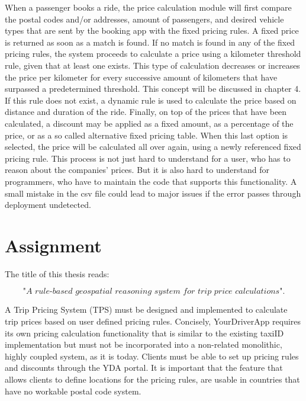 When a passenger books a ride, the price calculation module will first compare the postal codes and/or addresses, amount of passengers, and desired vehicle types that are sent by the booking app with the fixed pricing rules. A fixed price is returned as soon as a match is found. If no match is found in any of the fixed pricing rules, the system proceeds to calculate a price using a kilometer threshold rule, given that at least one exists. This type of calculation decreases or increases the price per kilometer for every successive amount of kilometers that have surpassed a predetermined threshold. This concept will be discussed in chapter 4. If this rule does not exist, a dynamic rule is used to calculate the price based on distance and duration of the ride. Finally, on top of the prices that have been calculated, a discount may be applied as a fixed amount, as a percentage of the price, or as a so called alternative fixed pricing table. When this last option is selected, the price will be calculated all over again, using a newly referenced fixed pricing rule. This process is not just hard to understand for a user, who has to reason about the companies' prices. But it is also hard to understand for programmers, who have to maintain the code that supports this functionality. A small mistake in the csv file could lead to major issues if the error passes through deployment undetected.

%
\section{Assignment}
The title of this thesis reads:

\[\textit{"A rule-based geospatial reasoning system for trip price calculations"}.\] \hfill

A Trip Pricing System (TPS) must be designed and implemented to calculate trip prices based on user defined pricing rules. Concisely, YourDriverApp requires its own pricing calculation functionality that is similar to the existing taxiID implementation but must not be incorporated into a non-related monolithic, highly coupled system, as it is today. Clients must be able to set up pricing rules and discounts through the YDA portal. It is important that the feature that allows clients to define locations for the pricing rules, are usable in countries that have no workable postal code system.

